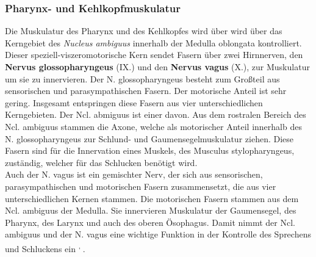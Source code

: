 \documentclass[12pt,a4paper,pdftex]{article}
\begin{document}
\subsubsection*{Pharynx- und Kehlkopfmuskulatur}
Die Muskulatur des Pharynx und des Kehlkopfes wird über wird über das Kerngebiet des \textit{Nucleus ambiguus}  innerhalb der Medulla oblongata kontrolliert. Dieser speziell-viszeromotorische Kern sendet Fasern über zwei Hirnnerven, den \textbf{Nervus glossopharyngeus} (IX.)  und den \textbf{Nervus vagus} (X.), zur Muskulatur um sie zu innervieren. Der N. glossopharyngeus besteht zum Großteil aus sensorischen und parasympathischen Fasern. Der motorische Anteil ist sehr gering. Insgesamt entspringen diese Fasern aus vier unterschiedlichen Kerngebieten. Der Ncl. abmiguus ist einer davon. Aus dem rostralen Bereich des Ncl. ambiguus stammen die Axone, welche als motorischer Anteil innerhalb des N. glossopharyngeus zur Schlund- und Gaumensegelmuskulatur ziehen. Diese Fasern sind für die Innervation eines Muskels, des Musculus stylopharyngeus, zuständig, welcher für das Schlucken benötigt wird. \\
Auch der N. vagus ist ein gemischter Nerv, der sich aus sensorischen, parasympathischen und motorischen Fasern zusammensetzt, die aus vier unterschiedlichen Kernen stammen. Die motorischen Fasern stammen aus dem Ncl. ambiguus der Medulla. Sie innervieren Muskulatur der Gaumensegel, des Pharynx, des Larynx und auch des oberen Ösophagus. Damit nimmt der Ncl. ambiguus und der N. vagus eine wichtige Funktion in der Kontrolle des Sprechens und Schluckens ein \textsuperscript{\cite[10]{crossman2014neuroanatomy}, \cite[5]{trepel2011neuroanatomie}}.       
\end{document}
